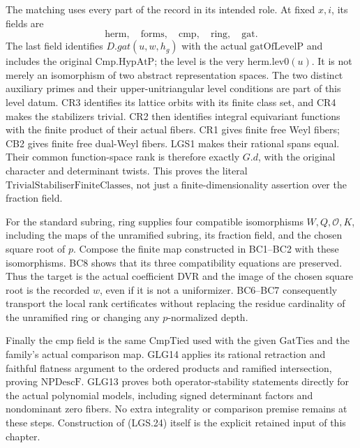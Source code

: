 The matching uses every part of the record in its intended
role.  At fixed \(x,i\), its fields are
\[
 \mathrm{herm},\quad \mathrm{forms},\quad
 \mathrm{cmp},\quad \mathrm{ring},\quad \mathrm{gat}.    \tag{LGS.24}
\]
The last field identifies \(D.gat(u,w,h_g)\) with the
actual \(\mathrm{gatOfLevelP}\) and includes the original
\(\mathrm{Cmp.HypAtP}\); the level is the very
\(\mathrm{herm.lev0}(u)\).  It is not merely an isomorphism
of two abstract representation spaces.
The two distinct auxiliary primes and their
upper-unitriangular level conditions are part of this
level datum.  CR3 identifies its lattice orbits with its
finite class set, and CR4 makes the stabilizers trivial.
CR2 then identifies integral equivariant functions with
the finite product of their actual fibers.  CR1 gives
finite free Weyl fibers; CB2 gives finite free
dual-Weyl fibers.  LGS1 makes their rational spans equal.
Their common function-space rank is therefore exactly
\(G.d\), with the original character and determinant
twists.  This proves the literal
\(\mathrm{TrivialStabiliserFiniteClasses}\), not just a
finite-dimensionality assertion over the fraction field.

For the standard subring, \(\mathrm{ring}\) supplies four
compatible isomorphisms \(W,Q,\mathcal O,K\), including the
maps of the unramified subring, its fraction field, and
the chosen square root of \(p\).  Compose the finite map
constructed in BC1--BC2 with these isomorphisms.
BC8 shows that its three compatibility equations are
preserved.  Thus the target is the actual coefficient
DVR and the image of the chosen square root is the
recorded \(w\), even if it is not a uniformizer.
BC6--BC7 consequently transport the local rank
certificates without replacing the residue cardinality
of the unramified ring or changing any \(p\)-normalized
depth.

Finally the \(\mathrm{cmp}\) field is the same
\(\mathrm{CmpTied}\) used with the given
\(\mathrm{GatTies}\) and the family's actual comparison
map.  GLG14 applies its rational retraction and faithful
flatness argument to the ordered products and ramified
intersection, proving \(\mathrm{NPDescF}\).
GLG13 proves both operator-stability statements directly
for the actual polynomial models, including signed
determinant factors and nondominant zero fibers.
No extra integrality or comparison premise remains at
these steps.  Construction of (LGS.24) itself is the
explicit retained input of this chapter.

